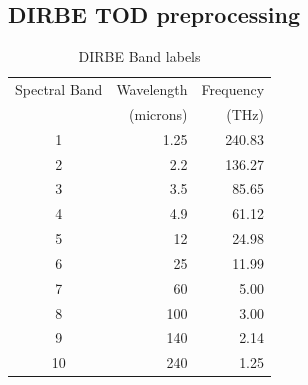 \documentclass{aa}
\begin{document}
\subsection{DIRBE TOD preprocessing}
\label{sec:tod}


 \begin{table}
\caption{DIRBE Band labels}              %
\label{table:1}      %
\centering                                      %
\begin{tabular}{c r r}          %
\hline\hline                        %
Spectral Band & Wavelength 
	& Frequency \\    %
 & (microns) & (THz) \\
\hline                                   %
	1 & 1.25  & 240.83\\      %
	2 & 2.2   & 136.27\\
	3 & 3.5   & 85.65\\
	4 & 4.9   & 61.12\\
	5 & 12    & 24.98\\
	6 & 25    & 11.99\\
	7 & 60    & 5.00 \\
	8 & 100   & 3.00 \\
	9 & 140   & 2.14 \\
	10 & 240  & 1.25\\
\hline                                             %
\end{tabular}
\end{table}
\end{document}
